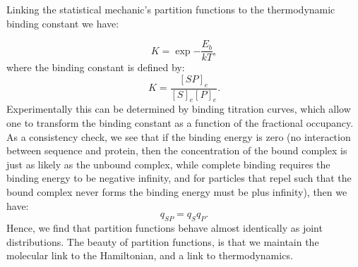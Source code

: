 Linking the statistical mechanic's partition functions to the thermodynamic binding constant we have:

\begin{equation}\label{k}
 K = \exp{-\frac{E_b}{kT} },
\end{equation}
where the binding constant is defined by:
\begin{equation}\label{k}
K=\frac{ [SP]_e }{[S]_e [P]_e}.
\end{equation}
   Experimentally this can be determined by binding titration curves, which allow one to transform the binding constant as a function of the fractional occupancy.  As a consistency check, we see that if the binding energy is zero (no interaction between sequence and protein, then the concentration of the bound complex is just as likely as the unbound complex, while complete binding requires the binding energy to be negative infinity, and for particles that repel such that the bound complex never forms the binding energy must be plus infinity), then we have:
\begin{equation}\label{}
  q_{SP} = q_S q_P.
\end{equation}
Hence, we find that partition functions behave almost identically as joint distributions.  The beauty of partition functions, is that we maintain the molecular link to the Hamiltonian, and a link to thermodynamics.
